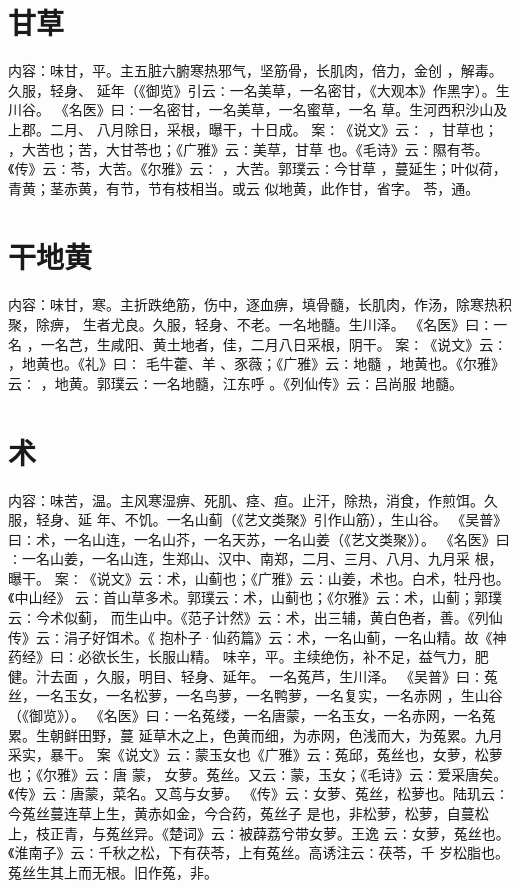 \documentclass[12pt,UTF8]{ctexbook}
\begin{document}
\section{甘草}
内容：味甘，平。主五脏六腑寒热邪气，坚筋骨，长肌肉，倍力，金创 ，解毒。久服，轻身、 
延年（《御览》引云∶一名美草，一名密甘，《大观本》作黑字）。生川谷。 
《名医》曰∶一名密甘，一名美草，一名蜜草，一名 草。生河西积沙山及上郡。二月、 
八月除日，采根，曝干，十日成。 
案∶《说文》云∶ ，甘草也； ，大苦也；苦，大甘苓也；《广雅》云∶美草，甘草 
也。《毛诗》云∶隰有苓。《传》云∶苓，大苦。《尔雅》云∶ ，大苦。郭璞云∶今甘草 
，蔓延生；叶似荷，青黄；茎赤黄，有节，节有枝相当。或云 似地黄，此作甘，省字。 
苓，通。 


\section{干地黄}
内容：味甘，寒。主折跌绝筋，伤中，逐血痹，填骨髓，长肌肉，作汤，除寒热积聚，除痹， 
生者尤良。久服，轻身、不老。一名地髓。生川泽。 
《名医》曰∶一名 ，一名芑，生咸阳、黄土地者，佳，二月八日采根，阴干。 
案∶《说文》云∶ ，地黄也。《礼》曰∶ 毛牛藿、羊 、豕薇；《广雅》云∶地髓 
，地黄也。《尔雅》云∶ ，地黄。郭璞云∶一名地髓，江东呼 。《列仙传》云∶吕尚服 
地髓。 


\section{术}
内容：味苦，温。主风寒湿痹、死肌、痉、疸。止汗，除热，消食，作煎饵。久服，轻身、延 
年、不饥。一名山蓟（《艺文类聚》引作山筋），生山谷。 
《吴普》曰∶术，一名山连，一名山芥，一名天苏，一名山姜（《艺文类聚》）。 
《名医》曰∶一名山姜，一名山连，生郑山、汉中、南郑，二月、三月、八月、九月采 
根，曝干。 
案∶《说文》云∶术，山蓟也；《广雅》云∶山姜，术也。白术，牡丹也。《中山经》 
云∶首山草多术。郭璞云∶术，山蓟也；《尔雅》云∶术，山蓟；郭璞云∶今术似蓟， 
而生山中。《范子计然》云∶术，出三辅，黄白色者，善。《列仙传》云∶涓子好饵术。《 
抱朴子·仙药篇》云∶术，一名山蓟，一名山精。故《神药经》曰∶必欲长生，长服山精。 
味辛，平。主续绝伤，补不足，益气力，肥健。汁去面 ，久服，明目、轻身、延年。 
一名菟芦，生川泽。 
《吴普》曰∶菟丝，一名玉女，一名松萝，一名鸟萝，一名鸭萝，一名复实，一名赤网 
，生山谷（《御览》）。 
《名医》曰∶一名菟缕，一名唐蒙，一名玉女，一名赤网，一名菟累。生朝鲜田野，蔓 
延草木之上，色黄而细，为赤网，色浅而大，为菟累。九月采实，暴干。 
案《说文》云∶蒙玉女也《广雅》云∶菟邱，菟丝也，女萝，松萝也；《尔雅》云∶唐 
蒙， 
女萝。菟丝。又云∶蒙，玉女；《毛诗》云∶爱采唐矣。《传》云∶唐蒙，菜名。又茑与女萝。 
《传》云∶女萝、菟丝，松萝也。陆玑云∶今菟丝蔓连草上生，黄赤如金，今合药，菟丝子 
是也，非松萝，松萝，自蔓松上，枝正青，与菟丝异。《楚词》云∶被薜荔兮带女萝。王逸 
云∶女萝，菟丝也。《淮南子》云∶千秋之松，下有茯苓，上有菟丝。高诱注云∶茯苓，千 
岁松脂也。菟丝生其上而无根。旧作菟，非。 
\end{document}

